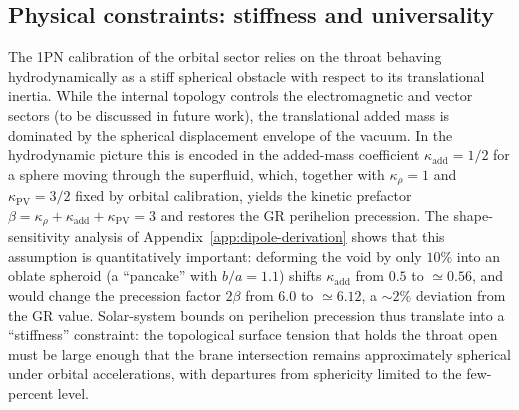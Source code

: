\documentclass[11pt]{article}
\begin{document}
\subsection{Physical constraints: stiffness and universality}
\label{subsec:discussion-stiffness}

The 1PN calibration of the orbital sector relies on the throat behaving
hydrodynamically as a stiff spherical obstacle with respect to its
translational inertia. While the internal topology controls the
electromagnetic and vector sectors (to be discussed in future work), the
translational added mass is dominated by the spherical displacement
envelope of the vacuum.  In the hydrodynamic picture this is encoded in
the added-mass coefficient $\kappa_{\mathrm{add}} = 1/2$ for a sphere
moving through the superfluid, which, together with $\kappa_\rho = 1$ and
$\kappa_{\mathrm{PV}} = 3/2$ fixed by orbital calibration, yields the kinetic prefactor
$\beta = \kappa_\rho + \kappa_{\mathrm{add}} + \kappa_{\mathrm{PV}} = 3$
and restores the GR perihelion precession.
The shape-sensitivity analysis of Appendix~\ref{app:dipole-derivation}
shows that this assumption is quantitatively important: deforming the void
by only $10\%$ into an oblate spheroid (a ``pancake'' with $b/a = 1.1$)
shifts $\kappa_{\mathrm{add}}$ from $0.5$ to $\simeq 0.56$, and would change
the precession factor $2\beta$ from $6.0$ to $\simeq 6.12$, a
$\sim 2\%$ deviation from the GR value.
Solar-system bounds on perihelion precession thus translate into a
``stiffness'' constraint: the topological surface tension that holds the
throat open must be large enough that the brane intersection remains
approximately spherical under orbital accelerations, with departures from
sphericity limited to the few-percent level.
\end{document}
